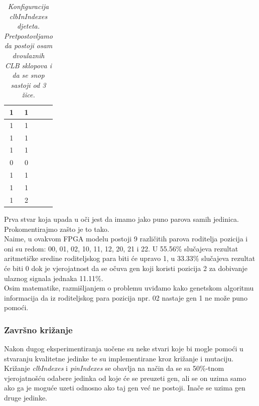 \documentclass[times, utf8, zavrsni]{fer}
\begin{document}
	\begin{table}[H]
		\caption{\emph{Konfiguracija \emph{clbInIndexes} djeteta. Pretpostovljamo da postoji osam dvoulaznih CLB sklopova i da se snop sastoji od 3 žice. }}
		\label{chromoClbIndexChild}
		\centering
		\begin{tabular}{|c|c|c|c|} \hline
			1 & 1 \\ \hline
			1 & 1 \\ \hline
			1 & 1 \\ \hline
			1 & 1 \\ \hline
			0 & 0 \\ \hline
			1 & 1 \\ \hline
			1 & 1 \\ \hline
			1 & 2 \\ \hline
		\end{tabular}
	\end{table}
	
	Prva stvar koja upada u oči jest da imamo jako puno parova samih jedinica. Prokomentirajmo zašto je to tako. \\
	Naime, u ovakvom FPGA modelu postoji 9 različitih parova roditelja pozicija i oni su redom: 00, 01, 02, 10, 11, 12, 20, 21 i 22. U 55.56\% slučajeva rezultat aritmetičke sredine roditeljskog para biti će upravo 1, u 33.33\% slučajeva rezultat će biti 0 dok je vjerojatnost da se očuva gen koji koristi pozicija 2 za dobivanje ulaznog signala jednaka 11.11\%. \\ 
	Osim matematike, razmišljanjem o problemu uviđamo kako genetskom algoritmu informacija da iz roditeljskog para pozicija npr. 02 nastaje gen 1 ne može puno pomoći. 
	
	
	\subsubsection{Završno križanje}
	\label{ValidCrosser}
	
	Nakon dugog eksperimentiranja uočene su neke stvari koje bi mogle pomoći u stvaranju kvalitetne jedinke te su implementirane kroz križanje i mutaciju. Križanje \emph{clbIndexes} i \emph{pinIndexes} se obavlja na način da se sa 50\%-tnom vjerojatnošću odabere jedinka od koje će se preuzeti gen, ali se on uzima samo ako ga je moguće uzeti odnosno ako taj gen već ne postoji. Inače se uzima gen druge jedinke.
	
\end{document}

